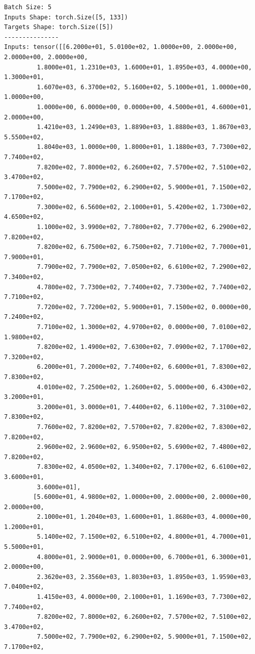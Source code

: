 \documentclass[
  letterpaper,
  DIV=11,
  numbers=noendperiod]{scrreprt}
\begin{document}
\begin{tcolorbox}
\begin{verbatim}
Batch Size: 5
Inputs Shape: torch.Size([5, 133])
Targets Shape: torch.Size([5])
---------------
Inputs: tensor([[6.2000e+01, 5.0100e+02, 1.0000e+00, 2.0000e+00, 2.0000e+00, 2.0000e+00,
         1.8000e+01, 1.2310e+03, 1.6000e+01, 1.8950e+03, 4.0000e+00, 1.3000e+01,
         1.6070e+03, 6.3700e+02, 5.1600e+02, 5.1000e+01, 1.0000e+00, 1.0000e+00,
         1.0000e+00, 6.0000e+00, 0.0000e+00, 4.5000e+01, 4.6000e+01, 2.0000e+00,
         1.4210e+03, 1.2490e+03, 1.8890e+03, 1.8880e+03, 1.8670e+03, 5.5500e+02,
         1.8040e+03, 1.0000e+00, 1.8000e+01, 1.1880e+03, 7.7300e+02, 7.7400e+02,
         7.8200e+02, 7.8000e+02, 6.2600e+02, 7.5700e+02, 7.5100e+02, 3.4700e+02,
         7.5000e+02, 7.7900e+02, 6.2900e+02, 5.9000e+01, 7.1500e+02, 7.1700e+02,
         7.3000e+02, 6.5600e+02, 2.1000e+01, 5.4200e+02, 1.7300e+02, 4.6500e+02,
         1.1000e+02, 3.9900e+02, 7.7800e+02, 7.7700e+02, 6.2900e+02, 7.8200e+02,
         7.8200e+02, 6.7500e+02, 6.7500e+02, 7.7100e+02, 7.7000e+01, 7.9000e+01,
         7.7900e+02, 7.7900e+02, 7.0500e+02, 6.6100e+02, 7.2900e+02, 7.3400e+02,
         4.7800e+02, 7.7300e+02, 7.7400e+02, 7.7300e+02, 7.7400e+02, 7.7100e+02,
         7.7200e+02, 7.7200e+02, 5.9000e+01, 7.1500e+02, 0.0000e+00, 7.2400e+02,
         7.7100e+02, 1.3000e+02, 4.9700e+02, 0.0000e+00, 7.0100e+02, 1.9800e+02,
         7.8200e+02, 1.4900e+02, 7.6300e+02, 7.0900e+02, 7.1700e+02, 7.3200e+02,
         6.2000e+01, 7.2000e+02, 7.7400e+02, 6.6000e+01, 7.8300e+02, 7.8300e+02,
         4.0100e+02, 7.2500e+02, 1.2600e+02, 5.0000e+00, 6.4300e+02, 3.2000e+01,
         3.2000e+01, 3.0000e+01, 7.4400e+02, 6.1100e+02, 7.3100e+02, 7.8300e+02,
         7.7600e+02, 7.8200e+02, 7.5700e+02, 7.8200e+02, 7.8300e+02, 7.8200e+02,
         2.9600e+02, 2.9600e+02, 6.9500e+02, 5.6900e+02, 7.4800e+02, 7.8200e+02,
         7.8300e+02, 4.0500e+02, 1.3400e+02, 7.1700e+02, 6.6100e+02, 3.6000e+01,
         3.6000e+01],
        [5.6000e+01, 4.9800e+02, 1.0000e+00, 2.0000e+00, 2.0000e+00, 2.0000e+00,
         2.1000e+01, 1.2040e+03, 1.6000e+01, 1.8680e+03, 4.0000e+00, 1.2000e+01,
         5.1400e+02, 7.1500e+02, 6.5100e+02, 4.8000e+01, 4.7000e+01, 5.5000e+01,
         4.8000e+01, 2.9000e+01, 0.0000e+00, 6.7000e+01, 6.3000e+01, 2.0000e+00,
         2.3620e+03, 2.3560e+03, 1.8030e+03, 1.8950e+03, 1.9590e+03, 7.0400e+02,
         1.4150e+03, 4.0000e+00, 2.1000e+01, 1.1690e+03, 7.7300e+02, 7.7400e+02,
         7.8200e+02, 7.8000e+02, 6.2600e+02, 7.5700e+02, 7.5100e+02, 3.4700e+02,
         7.5000e+02, 7.7900e+02, 6.2900e+02, 5.9000e+01, 7.1500e+02, 7.1700e+02,

\end{verbatim}
\end{tcolorbox}
\end{document}
